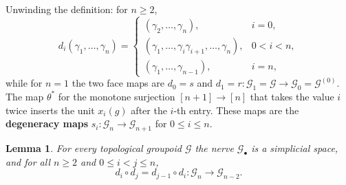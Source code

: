 \documentclass{extracta-temp-26}
\numberwithin{equation}{section}
\newtheorem{lem}[teo]{Lemma}
\theoremstyle{definition}
\theoremstyle{remark}
\newcommand{\G}{\mathcal{G}}
\newcommand{\term}[1]{\textbf{#1}}
\begin{document}
Unwinding the definition: for \(n\ge 2\),
\begin{equation}\label{eq:faces}
d_i(\gamma_1,\dots,\gamma_n)=
\begin{cases}
(\gamma_2,\dots,\gamma_n), & i=0,\\
(\gamma_1,\dots,\gamma_i\gamma_{i+1},\dots,\gamma_n), & 0<i<n,\\
(\gamma_1,\dots,\gamma_{n-1}), & i=n,
\end{cases}
\end{equation}
while for \(n=1\) the two face maps are \(d_0=s\) and \(d_1=r\colon\G_1=\G\to\G_0=\G^{(0)}\).
The map \(\theta^*\) for the monotone surjection \([n+1]\to[n]\) that takes the value \(i\) twice inserts the unit \(x_i(g)\) after the \(i\)-th entry.
These maps are the \term{degeneracy maps} \(s_i\colon\G_n\to\G_{n+1}\) for \(0\le i\le n\).

\begin{lem}\label{lem:nerve}
For every topological groupoid \(\G\) the nerve \(\G_\bullet\) is a simplicial space, and for all \(n\ge 2\) and \(0\le i<j\le n\),
\begin{equation}\label{eq:face-identity}
d_i\circ d_j=d_{j-1}\circ d_i\colon\G_n\to\G_{n-2}.
\end{equation}
\end{lem}
\end{document}
